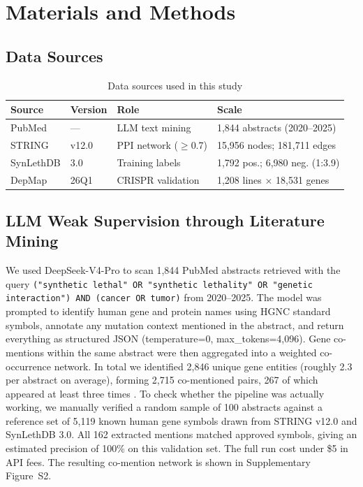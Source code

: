 \documentclass[12pt,a4paper]{article}
\begin{document}
\section{Materials and Methods}

\subsection{Data Sources}

\begin{table}[ht]
\centering
\small
\caption{Data sources used in this study}
\label{tab:data}
\begin{tabular}{llll}
\toprule
\textbf{Source} & \textbf{Version} & \textbf{Role} & \textbf{Scale} \\
\midrule
PubMed & --- & LLM text mining & 1,844 abstracts (2020--2025) \\
STRING & v12.0 & PPI network ($\geq$0.7) & 15,956 nodes; 181,711 edges \\
SynLethDB & 3.0 & Training labels & 1,792 pos.; 6,980 neg. (1:3.9) \\
DepMap & 26Q1 \cite{depmap2026} & CRISPR validation & 1,208 lines $\times$ 18,531 genes \\
\bottomrule
\end{tabular}
\end{table}

\subsection{LLM Weak Supervision through Literature Mining}

We used DeepSeek-V4-Pro to scan 1,844 PubMed abstracts retrieved with the query \texttt{("synthetic lethal" OR "synthetic lethality" OR "genetic interaction") AND (cancer OR tumor)} from 2020--2025. The model was prompted to identify human gene and protein names using HGNC standard symbols, annotate any mutation context mentioned in the abstract, and return everything as structured JSON (temperature=0, max\_tokens=4,096). Gene co-mentions within the same abstract were then aggregated into a weighted co-occurrence network. In total we identified 2,846 unique gene entities (roughly 2.3 per abstract on average), forming 2,715 co-mentioned pairs, 267 of which appeared at least three times \cite{fang2025}. To check whether the pipeline was actually working, we manually verified a random sample of 100 abstracts against a reference set of 5,119 known human gene symbols drawn from STRING v12.0 and SynLethDB 3.0. All 162 extracted mentions matched approved symbols, giving an estimated precision of 100\% on this validation set. The full run cost under \$5 in API fees. The resulting co-mention network is shown in Supplementary Figure~S2.
\end{document}
